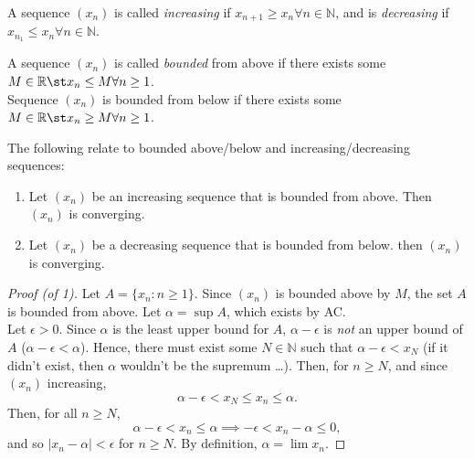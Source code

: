 \documentclass[12pt]{article}
\begin{document}
\begin{definition}
  A sequence $(x_n)$ is called \emph{increasing} if $x_{n+1} \geq x_n \forall n \in \mathbb{N}$, and is \emph{decreasing} if $x_{n_1} \leq x_n \forall n \in \mathbb{N}$.
\end{definition}

\begin{definition}
  A sequence $(x_n)$ is called \emph{bounded} from above if there exists some $M \in \mathbb{R} \st x_n \leq M \forall n \geq 1$.\\Sequence $(x_n)$ is bounded from below if there exists some $M \in \mathbb{R} \st x_n \geq M \forall n \geq 1$.
\end{definition}

\begin{theorem}\label{thm:mct}
  The following relate to bounded above/below and increasing/decreasing sequences:\footnotemark
  \begin{enumerate}
    \item Let $(x_n)$ be an increasing sequence that is bounded from above. Then $(x_n)$ is converging.
    \item Let $(x_n)$ be a decreasing sequence that is bounded from below. then $(x_n)$ is converging.
  \end{enumerate}
\end{theorem}

\begin{proof}[Proof (of 1)]
  Let $A = \{x_n: n \geq 1\}$. Since $(x_n)$ is bounded above by $M$, the set $A$ is bounded from above. Let $\alpha = \sup A$, which exists by AC.\\Let $\epsilon > 0$. Since $\alpha$ is the least upper bound for $A$, $\alpha - \epsilon$ is \textit{not} an upper bound of $A$ ($\alpha - \epsilon < \alpha$). Hence, there must exist some $N \in \mathbb{N}$ such that $\alpha - \epsilon < x_N$ (if it didn't exist, then $\alpha$ wouldn't be the supremum \dots). Then, for $n \geq N$, and since $(x_n)$ increasing, $$\alpha - \epsilon < x_N \leq x_n \leq \alpha.$$ Then, for all $n \geq N$, \[\alpha - \epsilon < x_n \leq \alpha \implies - \epsilon < x_n -\alpha \leq 0,\] and so $|x_n - \alpha| < \epsilon $ for $n \geq N$. By definition, $\alpha = \lim x_n$.
\end{proof}
\end{document}
